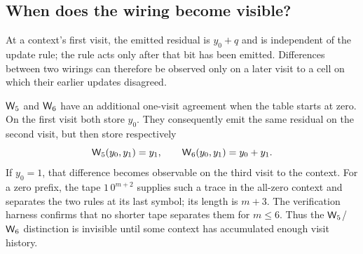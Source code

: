 \subsection{When does the wiring become visible?}

At a context's first visit, the emitted residual is $y_0+q$ and is independent of the update rule;
the rule acts only after that bit has been emitted.  Differences between two wirings can therefore
be observed only on a later visit to a cell on which their earlier updates disagreed.

$\mathsf{W}_{5}$ and $\mathsf{W}_{6}$ have an additional one-visit agreement when the table starts at zero.  On the
first visit both store $y_0$.  They consequently emit the same residual on the second visit, but
then store respectively
\[
  \mathsf{W}_{5}(y_0,y_1)=y_1,
  \qquad
  \mathsf{W}_{6}(y_0,y_1)=y_0+y_1.
\]
If $y_0=1$, that difference becomes observable on the third visit to the context.  For a zero
prefix, the tape $1\,0^{m+2}$ supplies such a trace in the all-zero context and separates the two
rules at its last symbol; its length is $m+3$.  The verification harness confirms that no shorter
tape separates them for $m\le6$.  Thus the $\mathsf{W}_{5}$/$\mathsf{W}_{6}$ distinction is invisible until some
context has accumulated enough visit history.
